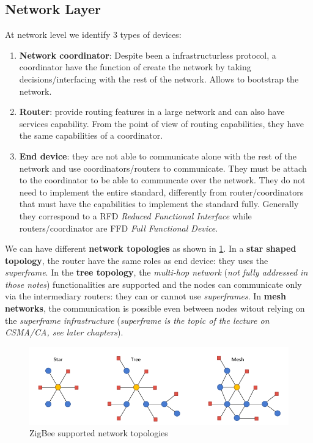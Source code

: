 \documentclass[10pt,a4paper]{report}
\theoremstyle{definition}
\begin{document}
\subsection{Network Layer}\label{sec:network-layer}
At network level we identify 3 types of devices:
\begin{enumerate}
	\item 
	\textbf{Network coordinator}: Despite been a infrastructurless protocol, a coordinator have the function of create the network by taking decisions/interfacing with the rest of the network. Allows to bootstrap the network.
	\item 
	\textbf{Router}: provide routing features in a large network and can also have services capability. From the point of view of routing capabilities, they have the same capabilities of a coordinator.
	\item 
	\textbf{End device}: they are not able to communicate alone with the rest of the network and use coordinators/routers to communicate. They must be attach to the coordinator to be able to communcate over the network. They do not need to implement the entire standard, differently from router/coordinators that must have the capabilities to implement the standard fully. Generally they correspond to a RFD \textit{Reduced Functional Interface} while routers/coordinator are FFD \textit{Full Functional Device}.
	
\end{enumerate}
We can have different \textbf{network topologies} as shown in \ref{net-topologies}.
In a \textbf{star shaped topology}, the router have the same roles as end device: they uses the \textit{superframe}. In the \textbf{tree topology}, the \textit{multi-hop network} (\textit{not fully addressed in those notes}) functionalities are supported and the nodes can communicate only via the intermediary routers: they can or cannot use \textit{superframes}. In \textbf{mesh networks}, the communication is possible even between nodes witout relying on the \textit{superframe infrastructure} (\textit{superframe is the topic of the lecture on CSMA/CA, see later chapters}).

\begin{figure}[h]
	\centering\includegraphics[scale=0.50]{images/Pasted image 20230307164039.png}
	\caption{ZigBee supported network topologies}
	\label{net-topologies}
\end{figure}
\end{document}
